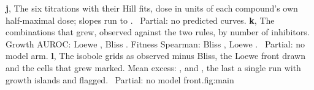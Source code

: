 {\textbf{j}, The six titrations with their Hill fits, dose in units of each compound's own
half-maximal dose; slopes run \hydhillMin{} to \hydhillMax{}.
\, Partial: no predicted curves.
\textbf{k}, The combinations that grew, observed against the two rules, by number of
inhibitors. Growth AUROC: Loewe \hydloeweAuroc{}, Bliss \hydblissAuroc{}. Fitness
Spearman: Bliss \hydblissSpearman{}, Loewe \hydloeweSpearman{}.
\, Partial: no model arm.
\textbf{l}, The \hydnIsoboles{} isobole grids as observed minus Bliss, the Loewe front
drawn and the cells that grew marked. Mean excess: \hydisoboleExTwoSixExcess{},
\hydisoboleExTwoSevenExcess{} and \hydisoboleExTwoEightExcess{}, the last a single run
with growth islands and flagged. \, Partial: no model
front.}{fig:main}

\clearpage

